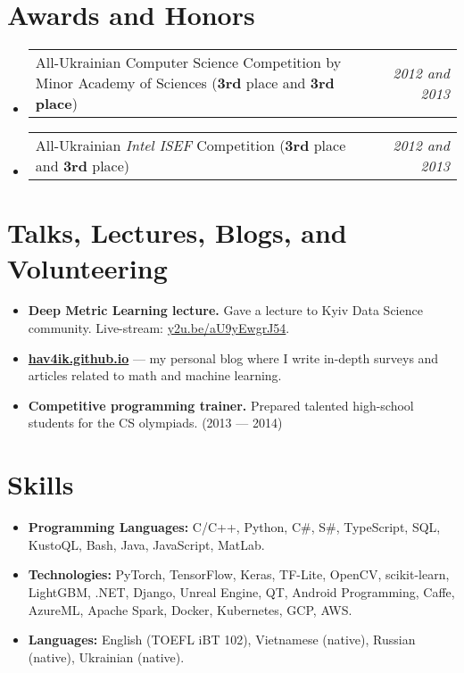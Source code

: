 \documentclass[letterpaper,11pt]{article}
\makeatletter
\newcommand{\resumeItemWithHeader}[2]{
  \item[--]\small{
    \textbf{#1}{ #2 \vspace{-2pt}}
  }
}
\newcommand{\awardsCustomItem}[2]{
  \item[--]
  \begin{tabular*}{0.97\textwidth}{l@{\extracolsep{\fill}}r}
    {\small#1} & \textit{\small#2} \\
  \end{tabular*}\vspace{-7.5pt}
}
\newcommand{\resumeSubItem}[2]{\resumeItemWithHeader{#1}{#2}\vspace{-4pt}}
\newcommand{\resumeSubHeadingListStart}{\begin{itemize}[leftmargin=*]}
\newcommand{\resumeSubHeadingListEnd}{\end{itemize}}
\makeatother
\begin{document}
\section{Awards and Honors}
  \resumeSubHeadingListStart
    \awardsCustomItem
      {All-Ukrainian Computer Science Competition by Minor Academy of Sciences ({\bf 3rd} place and {\bf 3rd place})}{2012 and 2013}
    \awardsCustomItem
      {All-Ukrainian {\it Intel ISEF} Competition ({\bf 3rd} place and {\bf 3rd} place)}{2012 and 2013}
  \resumeSubHeadingListEnd


\section{Talks, Lectures, Blogs, and Volunteering}
  \resumeSubHeadingListStart
    \resumeSubItem{Deep Metric Learning lecture.}
      {Gave a lecture to Kyiv Data Science community. Live-stream: \href{https://www.youtube.com/watch?v=aU9yEwgrJ54}{y2u.be/aU9yEwgrJ54}.}
    \resumeSubItem{\href{https://hav4ik.github.io/articles/}{hav4ik.github.io}}
      {--- my personal blog where I write in-depth surveys and articles related to math and machine learning.}
    \resumeSubItem{Competitive programming trainer.}
      {Prepared talented high-school students for the CS olympiads. (2013 --- 2014)}
    
  \resumeSubHeadingListEnd

\section{Skills}
 \resumeSubHeadingListStart
   \resumeSubItem{\bf Programming Languages:}
     {C/C++, Python, C\#, S\#, TypeScript, SQL, KustoQL, Bash, Java, JavaScript, MatLab.}
   \resumeSubItem{\bf Technologies:}
     {PyTorch, TensorFlow, Keras, TF-Lite, OpenCV, scikit-learn, LightGBM, .NET, Django, Unreal Engine, QT, Android Programming, Caffe, AzureML, Apache Spark, Docker, Kubernetes, GCP, AWS.}
   \resumeSubItem{\bf Languages:}
     {English (TOEFL iBT 102), Vietnamese (native), Russian (native), Ukrainian (native).}
 \resumeSubHeadingListEnd


\end{document}
